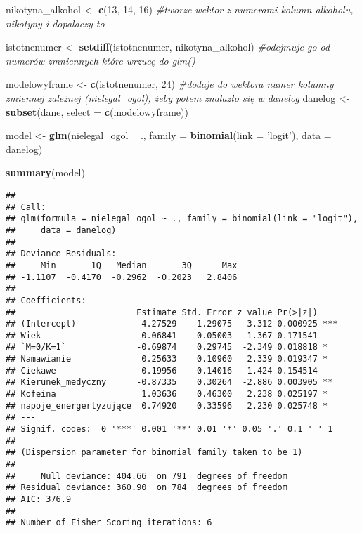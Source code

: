 \documentclass[]{article}
\newenvironment{Shaded}{\begin{snugshade}}{\end{snugshade}}
\newcommand{\KeywordTok}[1]{\textcolor[rgb]{0.13,0.29,0.53}{\textbf{#1}}}
\newcommand{\DataTypeTok}[1]{\textcolor[rgb]{0.13,0.29,0.53}{#1}}
\newcommand{\DecValTok}[1]{\textcolor[rgb]{0.00,0.00,0.81}{#1}}
\newcommand{\StringTok}[1]{\textcolor[rgb]{0.31,0.60,0.02}{#1}}
\newcommand{\CommentTok}[1]{\textcolor[rgb]{0.56,0.35,0.01}{\textit{#1}}}
\newcommand{\OperatorTok}[1]{\textcolor[rgb]{0.81,0.36,0.00}{\textbf{#1}}}
\newcommand{\NormalTok}[1]{#1}
\begin{document}
\begin{Shaded}
\begin{Highlighting}[]
\NormalTok{nikotyna_alkohol <-}\StringTok{ }\KeywordTok{c}\NormalTok{(}\DecValTok{13}\NormalTok{, }\DecValTok{14}\NormalTok{, }\DecValTok{16}\NormalTok{) }\CommentTok{#tworze wektor z numerami kolumn alkoholu, nikotyny i dopalaczy to }

\NormalTok{istotnenumer <-}\StringTok{ }\KeywordTok{setdiff}\NormalTok{(istotnenumer, nikotyna_alkohol) }\CommentTok{#odejmuje go od numerów zmniennych które wrzucę do glm()}

\NormalTok{modelowyframe <-}\StringTok{ }\KeywordTok{c}\NormalTok{(istotnenumer, }\DecValTok{24}\NormalTok{) }\CommentTok{#dodaje do wektora numer kolumny zmiennej zależnej (nielegal_ogol), żeby potem znalazło się w danelog}
\NormalTok{danelog <-}\StringTok{ }\KeywordTok{subset}\NormalTok{(dane, }\DataTypeTok{select =} \KeywordTok{c}\NormalTok{(modelowyframe))}

\NormalTok{model <-}
\StringTok{  }\KeywordTok{glm}\NormalTok{(nielegal_ogol }\OperatorTok{~}\StringTok{ }\NormalTok{.,}
      \DataTypeTok{family =} \KeywordTok{binomial}\NormalTok{(}\DataTypeTok{link =} \StringTok{'logit'}\NormalTok{),}
      \DataTypeTok{data =}\NormalTok{ danelog)}

\KeywordTok{summary}\NormalTok{(model)}
\end{Highlighting}
\end{Shaded}

\begin{verbatim}
## 
## Call:
## glm(formula = nielegal_ogol ~ ., family = binomial(link = "logit"), 
##     data = danelog)
## 
## Deviance Residuals: 
##     Min       1Q   Median       3Q      Max  
## -1.1107  -0.4170  -0.2962  -0.2023   2.8406  
## 
## Coefficients:
##                        Estimate Std. Error z value Pr(>|z|)    
## (Intercept)            -4.27529    1.29075  -3.312 0.000925 ***
## Wiek                    0.06841    0.05003   1.367 0.171541    
## `M=0/K=1`              -0.69874    0.29745  -2.349 0.018818 *  
## Namawianie              0.25633    0.10960   2.339 0.019347 *  
## Ciekawe                -0.19956    0.14016  -1.424 0.154514    
## Kierunek_medyczny      -0.87335    0.30264  -2.886 0.003905 ** 
## Kofeina                 1.03636    0.46300   2.238 0.025197 *  
## napoje_energertyzujące  0.74920    0.33596   2.230 0.025748 *  
## ---
## Signif. codes:  0 '***' 0.001 '**' 0.01 '*' 0.05 '.' 0.1 ' ' 1
## 
## (Dispersion parameter for binomial family taken to be 1)
## 
##     Null deviance: 404.66  on 791  degrees of freedom
## Residual deviance: 360.90  on 784  degrees of freedom
## AIC: 376.9
## 
## Number of Fisher Scoring iterations: 6
\end{verbatim}
\end{document}
